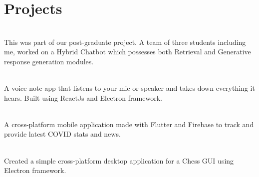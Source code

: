 \documentclass[]{dev-cv}
\begin{document}
\begin{minipage}[t]{0.66\textwidth}

\section{Projects}
 \\
\vspace{\topsep}
This was part of our post-graduate project. A team of three students including me, worked on a Hybrid Chatbot which possesses both Retrieval and Generative response generation modules.  
\sectionsep

 \\
\vspace{\topsep}
A voice note app that listens to your mic or speaker and takes down everything it hears. Built using ReactJs and Electron framework.
\sectionsep 

\\
\vspace{\topsep}
A cross-platform mobile application made with Flutter and Firebase to track and provide latest COVID stats and news.
\sectionsep

  \\
\vspace{\topsep}
Created a simple cross-platform desktop application for a Chess GUI using Electron framework.
\sectionsep


\end{minipage} 
\end{document}
